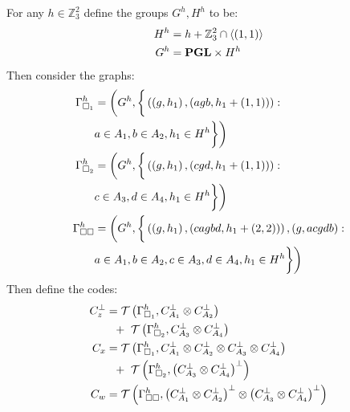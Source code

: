 \documentclass{article}
\begin{document}
\begin{multicols*}{2}
  For any $h \in \mathbb{Z}_{3}^{2} $ define the groups $G^{h}, H^{h}$ to be: 
  \begin{equation*}
    \begin{split}
      H^{h} &=  h + \mathbb{Z}_{3}^{2}\cap \braket{ \left( 1,1 \right)} \\
      G^{h} &=  \mathbf{PGL}  \times H^{h} 
    	\end{split}
\end{equation*} 
  Then consider the graphs:   
  \begin{equation*}
    \begin{split}
      \Gamma_{\square_{1}}^{h} &= \bigg( G^{h}, \bigg{\{} \left( \left(g, h_{1} \right),\left(  agb,h_{1} + \left( 1,1 \right)  \right)\right) :  \\ 
      &  a \in A_{1}, b \in A_{2}, h_{1} \in H^{h}  \bigg{\}}  \bigg) \\
      \Gamma_{\square_{2}}^{h} &= \bigg( G^{h}, \bigg{\{} \left( \left(g, h_{1} \right),\left(  cgd,h_{1} + \left( 1,1 \right)  \right)\right) :  \\ 
      &  c \in A_{3}, d \in A_{4}, h_{1} \in H^{h}  \bigg{\}}  \bigg) \\
      \Gamma_{\square \square}^{h} &= \bigg( G^{h}, \bigg{\{} \left(\left(g, h_{1} \right),\left(  cagbd, h_{1} + \left( 2,2 \right)  \right)\right), \left( g, acgdb \right) :\\
      & a \in A_{1}, b \in A_{2}, c \in A_{3}, d \in A_{4}, h_{1}\in H^{h} \bigg{\}}  \bigg) 
    \end{split}
  \end{equation*}
   Then define the codes:
	\begin{equation*}
	  \begin{split}
	    C_{z}^{\perp} & = \mathcal{T}\left( \Gamma_{\square_{1}}^{h},  C_{A_{1}}^{\perp} \otimes C_{A_{2}}^{\perp}  \right) \\
	    & \ \ + \ \mathcal{T}\left(  \Gamma_{\square_{2}}^{h}, C_{A_{3}}^{\perp} \otimes C_{A_{4}}^{\perp} \right) \\
	    C_{x} &=  \mathcal{T}\left(  \Gamma_{\square_{1}}^{h}, C_{A_{1}}^{\perp} \otimes C_{A_{2}}^{\perp} \otimes C_{A_{3}}^{\perp} \otimes C_{A_{4}}^{\perp}  \right) \\
	    & \ \ + \ \mathcal{T}\left( \Gamma_{\square_{2}}^{h},  \left( C_{A_{3}}^{\perp} \otimes C_{A_{4}}^{\perp} \right)^\perp  \right) \\
	    C_{w} &=  \mathcal{T}\left( \Gamma_{\square \square }^{h} , \left( C_{A_{1}}^{\perp} \otimes C_{A_{2}}^{\perp} \right)^\perp \otimes \left( C_{A_{3}}^{\perp} \otimes C_{A_{4}}^{\perp} \right)^\perp \right)   
	  \end{split}
	\end{equation*}

\end{multicols*}
\end{document}
